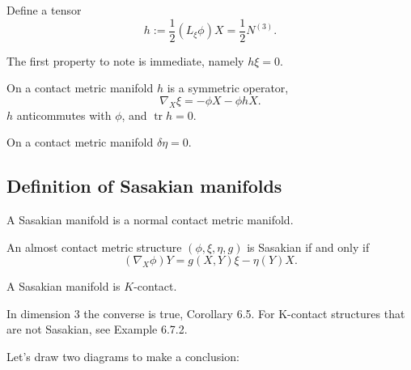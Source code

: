\begin{definition}
Define  a tensor
    \begin{equation}
        h:=\frac{1}{2}\left(L_{\xi} \phi\right) X=\frac{1}{2}N^{(3)}.
    \end{equation}
\end{definition}
\begin{remark}
    The first property to note is immediate, namely $h \xi=0$. 
\end{remark}

\begin{lemma}
    On a contact metric manifold $h$ is a symmetric operator,
    \begin{equation}
        \nabla_X \xi=-\phi X-\phi h X.
    \end{equation}
$h$ anticommutes with $\phi$, and $\operatorname{tr} h=0$.
\end{lemma}
\begin{corollary}
    On a contact metric manifold $\delta \eta=0$.
\end{corollary}

\subsection{Definition of Sasakian manifolds}

\begin{definition}
    A Sasakian manifold is a normal contact metric manifold.
\end{definition}
\begin{theorem}
    An almost contact metric structure $(\phi, \xi, \eta, g)$ is Sasakian if and only if
    \begin{equation}\label{eq28}
        \left(\nabla_X \phi\right) Y=g(X, Y) \xi-\eta(Y) X .
    \end{equation}
\end{theorem}

\begin{corollary}
    A Sasakian manifold is $K$-contact.
\end{corollary}
\begin{remark}
    In dimension 3 the converse is true, Corollary 6.5. For K-contact structures that are not Sasakian, see Example 6.7.2.
\end{remark}

Let's draw two diagrams to make a conclusion:

